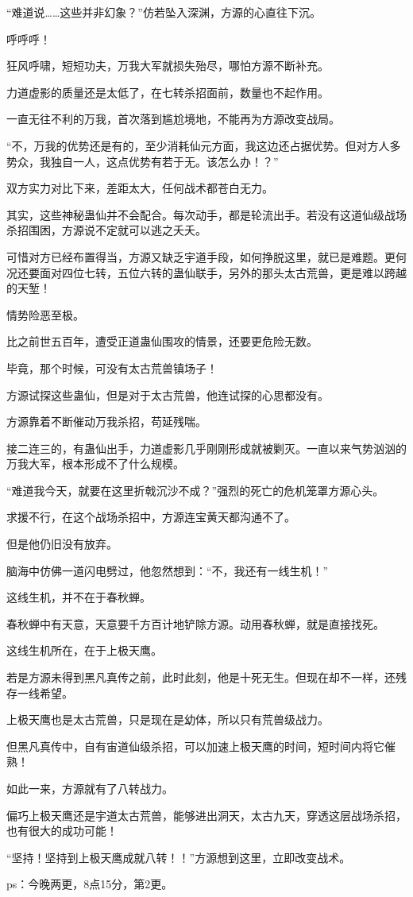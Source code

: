 \begin{this_body}
“难道说……这些并非幻象？”仿若坠入深渊，方源的心直往下沉。

呼呼呼！

狂风呼啸，短短功夫，万我大军就损失殆尽，哪怕方源不断补充。

力道虚影的质量还是太低了，在七转杀招面前，数量也不起作用。

一直无往不利的万我，首次落到尴尬境地，不能再为方源改变战局。

“不，万我的优势还是有的，至少消耗仙元方面，我这边还占据优势。但对方人多势众，我独自一人，这点优势有若于无。该怎么办！？”

双方实力对比下来，差距太大，任何战术都苍白无力。

其实，这些神秘蛊仙并不会配合。每次动手，都是轮流出手。若没有这道仙级战场杀招围困，方源说不定就可以逃之夭夭。

可惜对方已经布置得当，方源又缺乏宇道手段，如何挣脱这里，就已是难题。更何况还要面对四位七转，五位六转的蛊仙联手，另外的那头太古荒兽，更是难以跨越的天堑！

情势险恶至极。

比之前世五百年，遭受正道蛊仙围攻的情景，还要更危险无数。

毕竟，那个时候，可没有太古荒兽镇场子！

方源试探这些蛊仙，但是对于太古荒兽，他连试探的心思都没有。

方源靠着不断催动万我杀招，苟延残喘。

接二连三的，有蛊仙出手，力道虚影几乎刚刚形成就被剿灭。一直以来气势汹汹的万我大军，根本形成不了什么规模。

“难道我今天，就要在这里折戟沉沙不成？”强烈的死亡的危机笼罩方源心头。

求援不行，在这个战场杀招中，方源连宝黄天都沟通不了。

但是他仍旧没有放弃。

脑海中仿佛一道闪电劈过，他忽然想到：“不，我还有一线生机！”

这线生机，并不在于春秋蝉。

春秋蝉中有天意，天意要千方百计地铲除方源。动用春秋蝉，就是直接找死。

这线生机所在，在于上极天鹰。

若是方源未得到黑凡真传之前，此时此刻，他是十死无生。但现在却不一样，还残存一线希望。

上极天鹰也是太古荒兽，只是现在是幼体，所以只有荒兽级战力。

但黑凡真传中，自有宙道仙级杀招，可以加速上极天鹰的时间，短时间内将它催熟！

如此一来，方源就有了八转战力。

偏巧上极天鹰还是宇道太古荒兽，能够进出洞天，太古九天，穿透这层战场杀招，也有很大的成功可能！

“坚持！坚持到上极天鹰成就八转！！”方源想到这里，立即改变战术。

ps：今晚两更，8点15分，第2更。

\end{this_body}

